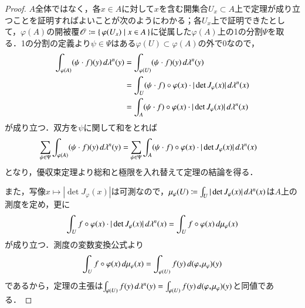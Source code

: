 \begin{proof}$A$全体ではなく，各$x \in A$に対して$x$を含む開集合$U_x \subset A$上で定理が成り立つことを証明すればよいことが次のようにわかる；各$U_x$上で証明できたとして，$\varphi(A)$の開被覆$\mathscr{O} \coloneqq \set{\varphi(U_x) | x \in A}$に従属した$\varphi(A)$上の1の分割$\Psi$を取る．1の分割の定義より$\psi \in \Psi$はある$\varphi(U) \subset \varphi(A)$の外で0なので，
\begin{align}
\int_{\varphi(A)} (\psi \cdot f)(y) \mathop{}\!d\lambda^n(y) &= \int_{\varphi(U)} (\psi \cdot f)(y) \mathop{}\!d\lambda^n(y)\\
&= \int_U (\psi \cdot f) \circ \varphi(x) \cdot | \det J_\varphi(x) | \mathop{}\!d \lambda^n(x) \\
&= \int_A (\psi \cdot f) \circ \varphi(x) \cdot | \det J_\varphi(x) | \mathop{}\!d \lambda^n(x)
\end{align}が成り立つ．双方を$\psi$に関して和をとれば
\begin{align}
\sum_{\psi \in \Psi}\int_{\varphi(A)} (\psi \cdot f)(y) \mathop{}\!d\lambda^n(y) &= \sum_{\psi \in \Psi} \int_A (\psi \cdot f) \circ \varphi(x) \cdot | \det J_\varphi(x) | \mathop{}\!d \lambda^n(x)
\end{align}となり，優収束定理より総和と極限を入れ替えて定理の結論を得る．

また，写像$x \mapsto |\det J_\varphi(x)|$は可測なので，$\mu_{\varphi}(U) \coloneqq \int_U |\det J_\varphi(x)| \mathop{}\!d \lambda^n(x)$は$A$上の測度を定め，更に
\begin{equation}
\int_U f \circ \varphi(x) \cdot | \det J_\varphi(x) | \mathop{}\!d \lambda^n(x) = \int_U f \circ \varphi(x) \mathop{}\!d \mu_\varphi(x)
\end{equation}
が成り立つ．測度の変数変換公式より
\begin{equation}
\int_U f \circ \varphi(x) \mathop{}\!d \mu_\varphi(x) = \int_{\varphi(U)} f(y) \mathop{}\!d(\varphi_* \mu_\varphi)(y)
\end{equation}
であるから，定理の主張は$\int_{\varphi(U)} f(y) \mathop{}\!d\lambda^n(y) = \int_{\varphi(U)} f(y) \mathop{}\!d(\varphi_* \mu_\varphi)(y)$と同値である．


\end{proof}
